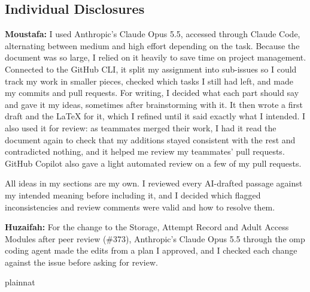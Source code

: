 \documentclass[12pt, titlepage]{article}
\begin{document}
\subsection*{Individual Disclosures}

\textbf{Moustafa:} I used Anthropic's Claude Opus 5.5, accessed through Claude
Code, alternating between medium and high effort depending on the task. Because
the document was so large, I relied on it heavily to save time on project
management. Connected to the GitHub CLI, it split my assignment into sub-issues
so I could track my work in smaller pieces, checked which tasks I still had
left, and made my commits and pull requests. For writing, I decided what each
part should say and gave it my ideas, sometimes after brainstorming with it. It
then wrote a first draft and the \LaTeX{} for it, which I refined until it said
exactly what I intended. I also used it for review: as teammates merged their
work, I had it read the document again to check that my additions stayed
consistent with the rest and contradicted nothing, and it helped me review my
teammates' pull requests. GitHub Copilot also gave a light automated review on
a few of my pull requests.

All ideas in my sections are my own. I reviewed every AI-drafted passage against
my intended meaning before including it, and I decided which flagged
inconsistencies and review comments were valid and how to resolve them.

\textbf{Huzaifah:} For the change to the Storage, Attempt Record and Adult
Access Modules after peer review (\#373), Anthropic's Claude Opus 5.5 through
the omp coding agent made the edits from a plan I approved, and I checked each
change against the issue before asking for review.

\newpage{}

 {plainnat}

\end{document}

